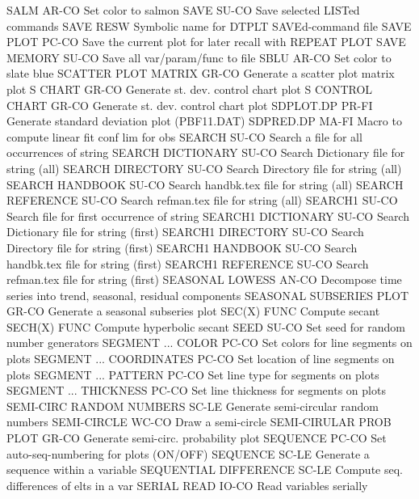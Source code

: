 SALM                        AR-CO Set color to salmon
SAVE                        SU-CO Save selected LISTed commands
SAVE                        RESW  Symbolic name for DTPLT SAVEd-command file
SAVE PLOT                   PC-CO Save the current plot for later recall with REPEAT PLOT
SAVE MEMORY                 SU-CO Save all var/param/func to file
SBLU                        AR-CO Set color to slate blue
SCATTER PLOT MATRIX         GR-CO Generate a scatter plot matrix plot
S CHART                     GR-CO Generate st. dev. control chart plot
S CONTROL CHART             GR-CO Generate st. dev. control chart plot
SDPLOT.DP                   PR-FI Generate standard deviation plot (PBF11.DAT)
SDPRED.DP                   MA-FI Macro to compute linear fit conf lim for obs
SEARCH                      SU-CO Search a file for all occurrences of string
SEARCH DICTIONARY           SU-CO Search Dictionary file for string (all)
SEARCH DIRECTORY            SU-CO Search Directory file for string (all)
SEARCH HANDBOOK             SU-CO Search handbk.tex file for string (all)
SEARCH REFERENCE            SU-CO Search refman.tex file for string (all)
SEARCH1                     SU-CO Search file for first occurrence of string
SEARCH1 DICTIONARY          SU-CO Search Dictionary file for string (first)
SEARCH1 DIRECTORY           SU-CO Search Directory file for string (first)
SEARCH1 HANDBOOK            SU-CO Search handbk.tex file for string (first)
SEARCH1 REFERENCE           SU-CO Search refman.tex file for string (first)
SEASONAL LOWESS             AN-CO Decompose time series into trend, seasonal, residual components
SEASONAL SUBSERIES PLOT     GR-CO Generate a seasonal subseries plot
SEC(X)                      FUNC  Compute secant
SECH(X)                     FUNC  Compute hyperbolic secant
SEED                        SU-CO Set seed for random number generators
SEGMENT ... COLOR           PC-CO Set colors for line segments on plots
SEGMENT ... COORDINATES     PC-CO Set location of line segments on plots
SEGMENT ... PATTERN         PC-CO Set line type for segments on plots
SEGMENT ... THICKNESS       PC-CO Set line thickness for segments on plots
SEMI-CIRC RANDOM NUMBERS    SC-LE Generate semi-circular random numbers
SEMI-CIRCLE                 WC-CO Draw a semi-circle
SEMI-CIRULAR PROB PLOT      GR-CO Generate semi-circ. probability plot
SEQUENCE                    PC-CO Set auto-seq-numbering for plots (ON/OFF)
SEQUENCE                    SC-LE Generate a sequence within a variable
SEQUENTIAL DIFFERENCE       SC-LE Compute seq. differences of elts in a var
SERIAL READ                 IO-CO Read variables serially
